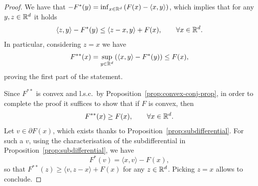 \documentclass{report}
\begin{document}
\begin{proof}
	We have that $-F^*(y)=\inf_{x\in\mathbb{R}^d} \left(F(x)-\langle x,y\rangle\right)$, which implies that for any $y,z\in\mathbb{R}^d$ it holds 
	\begin{equation}
		\langle z,y\rangle - F^*(y) \le \langle z-x,y\rangle +F(x), \qquad \forall x\in\mathbb{R}^d.
	\end{equation}
	In particular, considering $z=x$ we have 
	\begin{equation}
		F^{**}(x) = \sup_{y\in\mathbb{R}^d} \left(\langle x,y\rangle - F^*(y)\right) \le F(x),
	\end{equation}
	proving the first part of the statement.
	
	Since $F^{**}$ is convex and l.s.c.~by Proposition~\ref{prop:convex-conj-prop}, in order to complete the proof it suffices to show that if $F$ is convex, then 
	\begin{equation}
		F^{**}(x)\ge F(x),\qquad \forall x\in\mathbb{R}^d.
	\end{equation}
	Let $v\in \partial F(x)$, which exists thanks to Proposition~\ref{prop:subdifferential}. For such a $v$, using the characterisation of the subdifferential in Proposition~\ref{prop:subdifferential}, we have 
	\begin{equation}
		F^*(v)=\langle x,v\rangle - F(x), 
	\end{equation}
	so that $F^{**}(z)\ge \langle v,z-x\rangle+F(x)$ for any $z\in \mathbb{R}^d$. Picking $z=x$ allows to conclude.
\end{proof}



\end{document}
